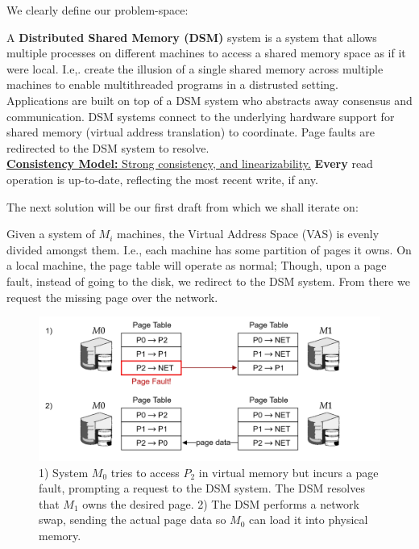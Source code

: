 \noindent
We clearly define our problem-space:

\begin{Def}
    
    A \textbf{Distributed Shared Memory (DSM)} system is a system that allows multiple processes on different machines to access a shared memory space as if it were local.
    I.e,. create the illusion of a single shared memory across multiple machines to enable multithreaded programs in a distrusted setting.\\

    \noindent
    Applications are built on top of a DSM system who abstracts away consensus and communication. DSM systems 
    connect to the underlying hardware support for shared memory (virtual address translation) to coordinate.
    Page faults are redirected to the DSM system to resolve.\\

    \noindent
    \underline{\textbf{Consistency Model:} Strong consistency, and linearizability.} \textbf{Every} read operation is up-to-date, reflecting the most recent write, if any.

\end{Def}

\noindent
The next solution will be our first draft from which we shall iterate on:
\begin{Def}

    Given a system of $M_i$ machines, the Virtual Address Space (VAS) is evenly divided amongst them. I.e.,
    each machine has some partition of pages it owns. On a local machine, the page table will operate as normal;
    Though, upon a page fault, instead of going to the disk, we redirect to the DSM system. From there we request the missing page
    over the network.
\end{Def}

\begin{figure}[h]
    \centering
    \includegraphics[width=\textwidth]{Sections/shared/share.png}
    \caption{1) System $M_0$ tries to access $P_2$ in virtual memory but incurs a page fault, prompting a request to the DSM system. The DSM resolves that $M_1$ owns the desired page. 
    2) The DSM performs a network swap, sending the actual page data so $M_0$ can load it into physical memory.
    }
    \label{fig:dsm}
\end{figure}

